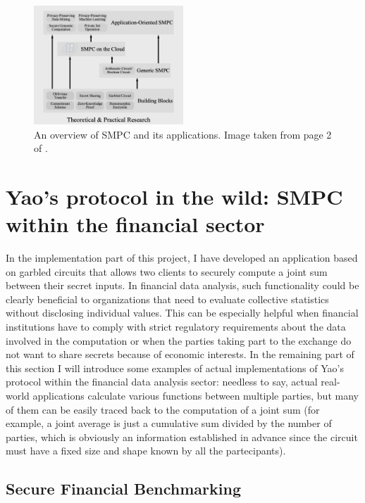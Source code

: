 \documentclass[12pt]{article}
\begin{document}
\begin{figure}[h]
    \centering
    \includegraphics[width=0.5\textwidth]{practicalapplications.png}
    \caption{An overview of SMPC and its applications. Image taken from page 2 of \cite{Applications}.}\label{fig:applications}
\end{figure}

\section{Yao's protocol in the wild: SMPC within the financial sector}\label{sec:applications}

In the implementation part of this project, I have developed an application based on garbled circuits that allows two clients to securely compute a joint sum between their secret inputs. In financial data analysis, such functionality could be clearly beneficial to organizations that need to evaluate collective statistics without disclosing individual values. This can be especially helpful when financial institutions have to comply with strict regulatory requirements about the data involved in the computation or when the parties taking part to the exchange do not want to share secrets because of economic interests. In the remaining part of this section I will introduce some examples of actual implementations of Yao's protocol within the financial data analysis sector: needless to say, actual real-world applications calculate various functions between multiple parties, but many of them can be easily traced back to the computation of a joint sum (for example, a joint average is just a cumulative sum divided by the number of parties, which is obviously an information established in advance since the circuit must have a fixed size and shape known by all the partecipants).

\subsection{Secure Financial Benchmarking}
\end{document}
